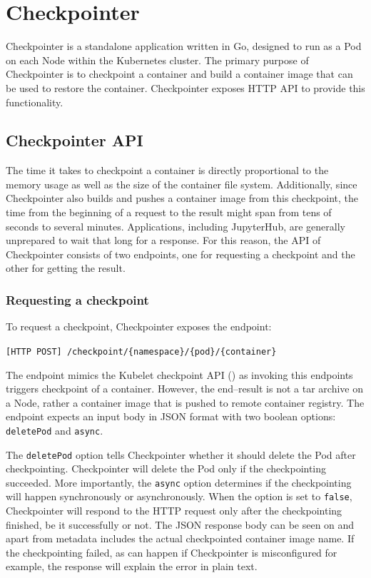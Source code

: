 \documentclass[
  digital,     %
  oneside,     %
  nosansbold,  %
  nocolorbold, %
  lof,         %
  nolot,         %
]{fithesis4}
\begin{document}
\chapter{Checkpointer}
\label{chap:checkpointer}

Checkpointer is a standalone application written in Go, designed to run as a Pod on each Node within the Kubernetes cluster. The primary purpose of Checkpointer is to checkpoint a container and build a container image that can be used to restore the container. Checkpointer exposes HTTP API to provide this functionality.

\section{Checkpointer API}
The time it takes to checkpoint a container is directly proportional to the memory usage as well as the size of the container file system. Additionally, since Checkpointer also builds and pushes a container image from this checkpoint, the time from the beginning of a request to the result might span from tens of seconds to several minutes. Applications, including JupyterHub, are generally unprepared to wait that long for a response. For this reason, the API of Checkpointer consists of two endpoints, one for requesting a checkpoint and the other for getting the result.

\subsection{Requesting a checkpoint}
To request a checkpoint, Checkpointer exposes the endpoint:
\begin{description}
  \item \texttt{[HTTP POST] /checkpoint/\{namespace\}/\{pod\}/\{container\}}
\end{description}
The endpoint mimics the Kubelet checkpoint API () as invoking this endpoints triggers checkpoint of a container. However, the end--result is not a tar archive on a Node, rather a container image that is pushed to remote container registry. The endpoint expects an input body in JSON format with two boolean options: \texttt{deletePod} and \texttt{async}. 

The \texttt{deletePod} option tells Checkpointer whether it should delete the Pod after checkpointing. Checkpointer will delete the Pod only if the checkpointing succeeded. More importantly, the \texttt{async} option determines if the checkpointing will happen synchronously or asynchronously. When the option is set to \texttt{false}, Checkpointer will respond to the HTTP request only after the checkpointing finished, be it successfully or not. The JSON response body can be seen on  and apart from metadata includes the actual checkpointed container image name. If the checkpointing failed, as can happen if Checkpointer is misconfigured for example, the response will explain the error in plain text.
\end{document}
